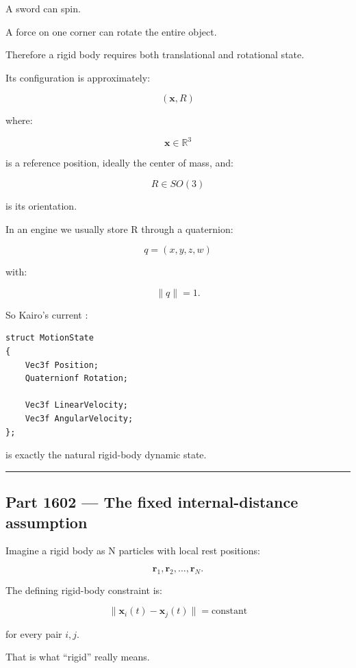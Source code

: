 A sword can spin.

A force on one corner can rotate the entire object.

Therefore a rigid body requires both translational and rotational state.

Its configuration is approximately:

\[
(\mathbf{x},R)
\]

where:

\[
\mathbf{x}\in\mathbb{R}^{3}
\]

is a reference position, ideally the center of mass, and:

\[
R\in SO(3)
\]

is its orientation.

In an engine we usually store R through a quaternion:

\[
q=(x,y,z,w)
\]

with:

\[
\|q\|=1.
\]

So Kairo's current :

\begin{verbatim}
struct MotionState
{
    Vec3f Position;
    Quaternionf Rotation;

    Vec3f LinearVelocity;
    Vec3f AngularVelocity;
};
\end{verbatim}

is exactly the natural rigid-body dynamic state.

\begin{center}\rule{0.5\linewidth}{0.5pt}\end{center}

\subsection{Part 1602 --- The fixed internal-distance assumption}\label{06-engine-ii-ch034-part-1602-the-fixed-internal-distance-assumption}

\hypertarget{06-engine-ii-ch034-part-1602-the-fixed-internal-distance-assumption}{}

Imagine a rigid body as N particles with local rest positions:

\[
\mathbf{r}_1,\mathbf{r}_2,\dots,\mathbf{r}_N.
\]

The defining rigid-body constraint is:

\[
\boxed{
\|\mathbf{x}_i(t)-\mathbf{x}_j(t)\|
=
\text{constant}
}
\]

for every pair \(i,j\).

That is what ``rigid'' really means.

